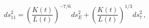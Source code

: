 \begin{equation}
\label{eq. elmetric}
ds_{11}^{2}=\left( \frac{K(t)}{L(t)}\right) ^{-7/6}ds_{E}^{2}+\left( \frac{K(t)}{L(t)}\right) ^{1/3}ds_{7}^{2}\, ,
\end{equation}

